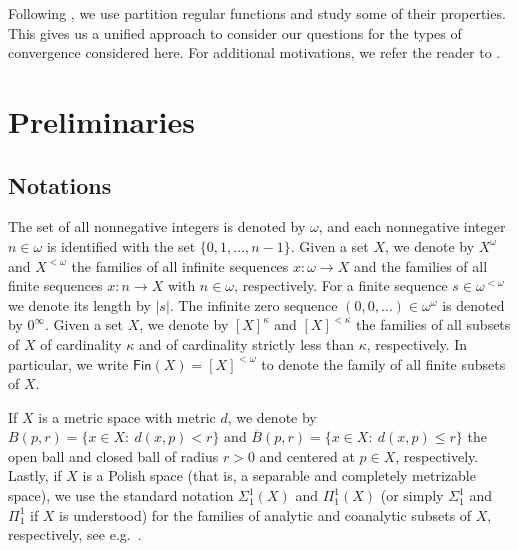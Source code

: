 \documentclass{amsart}
\theoremstyle{plain}
\theoremstyle{definition}
\theoremstyle{remark}
\newcommand{\FIN}{\mathsf{Fin}} \newcommand{\fin}{\FIN}
\newcommand{\Fin}{\FIN}
\begin{document}
Following \cite{FKK23}, we use partition regular functions and study some of their properties. This gives us a unified approach to consider our questions for the types of convergence considered here. For additional motivations, we refer the reader to \cite{FKK23}.


\section{Preliminaries}\label{sec:preliminaries}


\subsection{Notations} 

The set of all nonnegative integers is denoted by $\omega$, and each nonnegative integer $n \in \omega$ is identified with the set $\{0,1,\ldots,n-1\}$. 
Given a set $X$, we denote by 
$X^\omega$ and $X^{<\omega}$
 the families of all infinite sequences $x:\omega\to X$ 
 and the families of all finite sequences $x:n\to X$ with $n\in \omega$, respectively. 
 For a finite sequence $s\in\omega^{<\omega}$ we denote its length by $|s|$. The infinite zero sequence $(0,0,\ldots)\in\omega^\omega$ is denoted by $0^\infty$.
Given a set $X$, we denote by $[X]^\kappa$ and $[X]^{<\kappa}$ the families of all subsets of $X$ of cardinality $\kappa$ and of cardinality strictly less than $\kappa$, respectively. 
In particular, we write $\Fin(X)=[X]^{<\omega}$ to denote the family of all finite subsets of $X$.






If $X$ is a metric space with metric $d$, we denote by $B(p,r)=\{x\in X:\ d(x,p)<r\}$ and $\overline{B}(p,r)=\{x\in X:\ d(x,p)\leq r\}$ the open ball and closed ball of radius $r>0$  and centered at $p \in X$, respectively. 
Lastly, if $X$ is a Polish space (that is, a separable and completely metrizable space), we use the standard notation $\Sigma^1_1(X)$ and $\Pi^1_1(X)$ (or simply $\Sigma^1_1$ and $\Pi^1_1$ if $X$ is understood) for the families of analytic and coanalytic subsets of $X$, respectively, see e.g.~\cite{MR1321597}.

\end{document}
